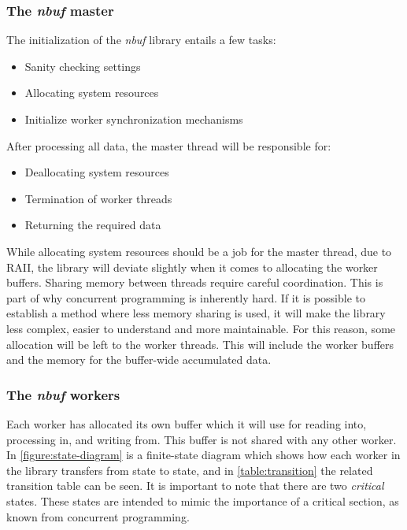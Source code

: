 \documentclass[a4paper]{article}
\newcommand{\nbuf}{\textit{nbuf} }
\begin{document}
\subsubsection{The \nbuf master}
The initialization of the \nbuf library entails a few tasks:

\begin{itemize}
\item Sanity checking settings
\item Allocating system resources
\item Initialize worker synchronization mechanisms
\end{itemize} 

After processing all data, the master thread will be responsible for:

\begin{itemize}
\item Deallocating system resources
\item Termination of worker threads
\item Returning the required data
\end{itemize} 

While allocating system resources should be a job for the master thread, due to RAII, the library will deviate slightly when it comes to allocating the worker buffers. Sharing memory between threads require careful coordination. This is part of why concurrent programming is inherently hard. If it is possible to establish a method where less memory sharing is used, it will make the library less complex, easier to understand and more maintainable. For this reason, some allocation will be left to the worker threads. This will include the worker buffers and the memory for the buffer-wide accumulated data.



\subsubsection{The \nbuf workers}

Each worker has allocated its own buffer which it will use for reading into, processing in, and writing from. This buffer is not shared with any other worker.\\

In \autoref{figure:state-diagram} is a finite-state diagram which shows how each worker in the library transfers from state to state, and in \autoref{table:transition} the related transition table can be seen. It is important to note that there are two \textit{critical} states. These states are intended to mimic the importance of a critical section, as known from concurrent programming.\\
\end{document}
